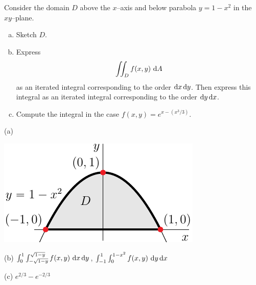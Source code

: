 \begin{question}[M200 2015D] %
Consider the domain $D$ above the $x$--axis and below parabola 
$y = 1-x^2$ in the $xy$--plane.
\begin{enumerate}[(a)]
\item
Sketch $D$.
\item
Express
\begin{equation*}
\dblInt_D f(x,y)\ \dee{A}
\end{equation*}
as an iterated integral corresponding to the order $\mathrm{d}x\,\mathrm{d}y$. 
Then express this integral as an iterated integral corresponding to 
the order $\mathrm{d}y\,\mathrm{d}x$.
\item
Compute the integral in the case $f(x,y) = e^{x-(x^3/3)}$.
\end{enumerate}
\end{question}

%

\begin{answer}
(a)

\begin{center}
\includegraphics{fig/OE15D_6.pdf}
\end{center}


(b) $\int_0^1 \int_{-\sqrt{1-y}}^{\sqrt{1-y}} f(x,y)\ \mathrm{d}x\,\mathrm{d}y$,
    $\int_{-1}^1 \int_0^{1-x^2} f(x,y)\ \dee{y}\,\dee{x}$

(c) $e^{2/3}-e^{-2/3}$
\end{answer}

